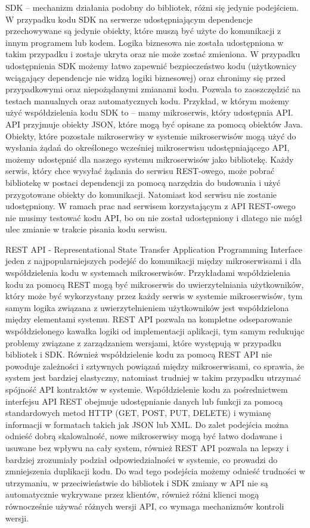 \documentclass[runningheads,12pt]{llncs}
\begin{document}
SDK – mechanizm działania podobny do bibliotek, różni się jedynie podejściem. W przypadku kodu SDK na serwerze udostępniającym dependencje przechowywane są jedynie obiekty, które muszą być użyte do komunikacji z innym programem lub kodem. Logika biznesowa nie została udostępniona w takim przypadku i zostaje ukryta oraz nie może zostać zmieniona. W przypadku udostępnienia SDK możemy łatwo zapewnić bezpieczeństwo kodu (użytkownicy wciągający dependencje nie widzą logiki biznesowej) oraz chronimy się przed przypadkowymi oraz niepożądanymi zmianami kodu. Pozwala to zaoszczędzić na testach manualnych oraz automatycznych kodu. Przykład, w którym możemy użyć współdzielenia kodu SDK to – mamy mikroserwis, który udostępnia API. API przyjmuje obiekty JSON, które mogą być opisane za pomocą obiektów Java. Obiekty, które pozostałe mikroserwisy w systemie mikroserwisów mogą użyć do wysłania żądań do określonego wcześniej mikroserwisu udostępniającego API, możemy udostępnić dla naszego systemu mikroserwisów jako bibliotekę. Każdy serwis, który chce wysyłać żądania do serwisu REST-owego, może pobrać bibliotekę w postaci dependencji za pomocą narzędzia do budowania i użyć przygotowane obiekty do komunikacji. Natomiast kod serwisu nie zostanie udostępniony. W ramach prac nad serwisem korzystającym z API REST-owego nie musimy testować kodu API, bo on nie został udostępniony i dlatego nie mógł ulec zmianie w trakcie pisania kodu serwisu.

REST API - Representational State Transfer Application Programming Interface jeden z najpopularniejszych podejść do komunikacji między mikroserwisami i dla współdzielenia kodu w systemach mikroserwisów. Przykładami współdzielenia kodu za pomocą REST mogą być mikroserwis do uwierzytelniania użytkowników, który może być wykorzystany przez każdy serwis w systemie mikroserwisów, tym samym logika związana z uwierzytelnieniem użytkowników jest współdzielona między elementami systemu. REST API pozwala na kompletne odseparowanie współdzielonego kawałka logiki od implementacji aplikacji, tym samym redukując problemy związane z zarządzaniem wersjami, które występują w przypadku bibliotek i SDK. Również współdzielenie kodu za pomocą REST API nie powoduje zależności i sztywnych powiązań między mikroserwisami, co sprawia, że system jest bardziej elastyczny, natomiast trudniej w takim przypadku utrzymać spójność API kontraktów w systemie. Współdzielenie kodu za pośrednictwem interfejsu API REST obejmuje udostępnianie danych lub funkcji za pomocą standardowych metod HTTP (GET, POST, PUT, DELETE) i wymianę informacji w formatach takich jak JSON lub XML. Do zalet podejścia można odnieść dobrą skalowalność, nowe mikroserwisy mogą być łatwo dodawane i usuwane bez wpływu na cały system, również REST API pozwala na lepszy i bardziej zrozumiały podział odpowiedzialności w systemie, co prowadzi do zmniejszenia duplikacji kodu. Do wad tego podejścia możemy odnieść trudności w utrzymaniu, w przeciwieństwie do bibliotek i SDK zmiany w API nie są automatycznie wykrywane przez klientów, również różni klienci mogą równocześnie używać różnych wersji API, co wymaga mechanizmów kontroli wersji.
\end{document}
